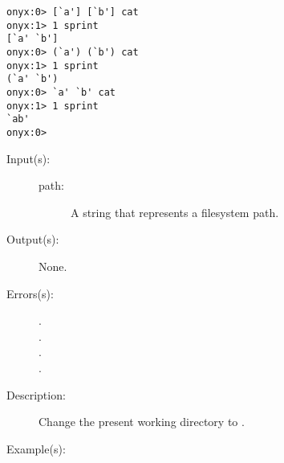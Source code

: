 \begin{description}
\begin{description}
\begin{verbatim}
onyx:0> [`a'] [`b'] cat
onyx:1> 1 sprint
[`a' `b']
onyx:0> (`a') (`b') cat
onyx:1> 1 sprint
(`a' `b')
onyx:0> `a' `b' cat
onyx:1> 1 sprint
`ab'
onyx:0>
		\end{verbatim}
	\end{description}
\label{systemdict:cd}
\item[{\onyxop{path}{cd}{--}}: ]
	\begin{description}\item[]
	\item[Input(s): ]
		\begin{description}\item[]
		\item[path: ]
			A string that represents a filesystem path.
		\end{description}
	\item[Output(s): ] None.
	\item[Errors(s): ]
		\begin{description}\item[]
		\item[.]
		\item[.]
		\item[.]
		\item[.]
		\end{description}
	\item[Description: ]
		Change the present working directory to .
	\item[Example(s): ]\begin{verbatim}


\end{verbatim}
\end{description}
\end{description}
